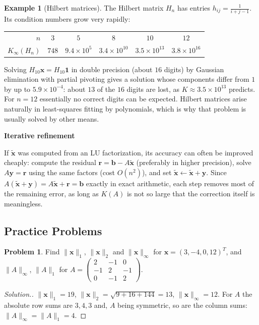 \documentclass[11pt,a4paper]{article}
\numberwithin{equation}{section}
\theoremstyle{definition}
\newtheorem{exa}[thm]{Example}
\newtheorem{problemx}{Problem}[subsection]
\newenvironment{problem}{\begin{problemx}}{\end{problemx}}
\newenvironment{solution}
  {\renewcommand{\qedsymbol}{}\begin{proof}[\textit{Solution}.]}
  {\end{proof}}
\newcommand{\subhead}[1]{%
  \par\medskip\noindent\textbf{#1}\par\nobreak\smallskip}
\begin{document}
\begin{exa}[Hilbert matrices]
\label{exa:hilbert}
The Hilbert matrix $H_n$ has entries $h_{ij} = \frac{1}{i+j-1}$. Its condition numbers grow very rapidly:
\begin{center}
\begin{tabular}{rccccc}
\hline
$n$ & $3$ & $5$ & $8$ & $10$ & $12$\\
$K_\infty(H_n)$ & $748$ & $9.4\times10^5$ & $3.4\times10^{10}$ & $3.5\times10^{13}$ & $3.8\times10^{16}$\\
\hline
\end{tabular}
\end{center}
Solving $H_{10}\mathbf x = H_{10}\mathbf 1$ in double precision (about $16$ digits) by Gaussian elimination with partial pivoting gives a
solution whose components differ from $1$ by up to $5.9\times10^{-4}$: about $13$ of the $16$ digits are lost, as $K\approx3.5\times10^{13}$
predicts. For $n = 12$ essentially no correct digits can be expected. Hilbert matrices arise naturally in least-squares fitting by
polynomials, which is why that problem is usually solved by other means.
\end{exa}

\subhead{Iterative refinement}
If $\tilde{\mathbf x}$ was computed from an LU factorization, its accuracy can often be improved cheaply: compute the residual
$\mathbf r = \mathbf b-A\tilde{\mathbf x}$ (preferably in higher precision), solve $A\mathbf y = \mathbf r$ using the same factors (cost $O(n^2)$),
and set $\tilde{\mathbf x}\leftarrow\tilde{\mathbf x}+\mathbf y$. Since $A(\tilde{\mathbf x}+\mathbf y) = A\tilde{\mathbf x}+\mathbf r = \mathbf b$
exactly in exact arithmetic, each step removes most of the remaining error, as long as $K(A)$ is not so large that the correction
itself is meaningless.


\subsection{Practice Problems}

\begin{problem}
Find $\|\mathbf x\|_1$, $\|\mathbf x\|_2$ and $\|\mathbf x\|_\infty$ for $\mathbf x = (3,-4,0,12)^T$, and $\|A\|_\infty$, $\|A\|_1$ for
$A = \begin{pmatrix}2&-1&0\\-1&2&-1\\0&-1&2\end{pmatrix}$.
\end{problem}
\begin{solution}
$\|\mathbf x\|_1 = 19$, $\|\mathbf x\|_2 = \sqrt{9+16+144} = 13$, $\|\mathbf x\|_\infty = 12$. For $A$ the absolute row sums are $3, 4, 3$ and, $A$ being
symmetric, so are the column sums: $\|A\|_\infty = \|A\|_1 = 4$.
\end{solution}
\end{document}
